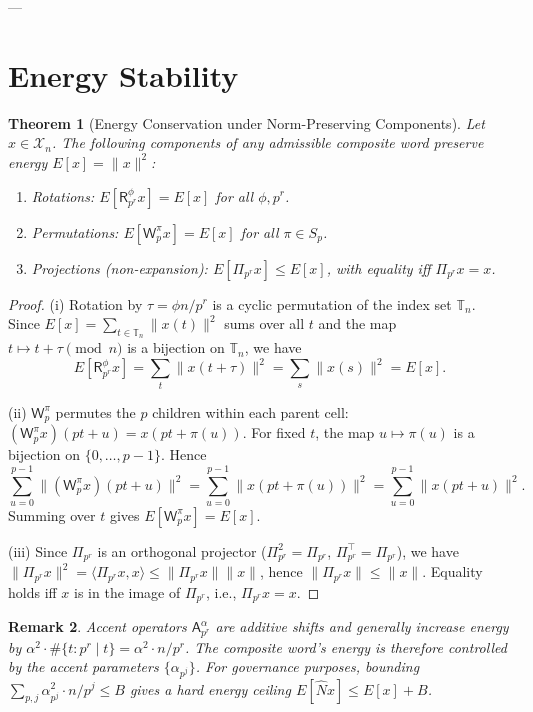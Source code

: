 \documentclass[11pt]{amsart}
\newtheorem{theorem}{Theorem}[section]
\newtheorem{remark}[theorem]{Remark}
\newcommand{\X}{\mathcal{X}}
\newcommand{\Prj}{\Pi}
\newcommand{\Ap}{\mathsf{A}}
\newcommand{\Rp}{\mathsf{R}}
\newcommand{\Wp}{\mathsf{W}}
\newcommand{\bN}{\widehat{N}}
\newcommand{\Tn}{\mathbb{T}_n}
\newcommand{\norm}[1]{\lVert #1 \rVert}
\begin{document}
---

\section{Energy Stability}

\begin{theorem}[Energy Conservation under Norm-Preserving Components]\label{thm:energy}
Let $x \in \X_n$. The following components of any admissible composite word preserve energy $E[x] = \norm{x}^2$:
\begin{enumerate}
  \item[(i)] Rotations: $E[\Rp^\phi_{p^r} x] = E[x]$ for all $\phi, p^r$.
  \item[(ii)] Permutations: $E[\Wp^\pi_p x] = E[x]$ for all $\pi \in S_p$.
  \item[(iii)] Projections (non-expansion): $E[\Prj_{p^r} x] \leq E[x]$, with equality iff $\Prj_{p^r} x = x$.
\end{enumerate}
\end{theorem}

\begin{proof}
(i) Rotation by $\tau = \phi n/p^r$ is a cyclic permutation of the index set $\Tn$. Since $E[x] = \sum_{t \in \Tn}\norm{x(t)}^2$ sums over all $t$ and the map $t \mapsto t + \tau \pmod{n}$ is a bijection on $\Tn$, we have
\[
  E[\Rp^\phi_{p^r} x] = \sum_{t}\norm{x(t+\tau)}^2 = \sum_{s}\norm{x(s)}^2 = E[x].
\]

(ii) $\Wp^\pi_p$ permutes the $p$ children within each parent cell: $(\Wp^\pi_p x)(pt+u) = x(pt + \pi(u))$. For fixed $t$, the map $u \mapsto \pi(u)$ is a bijection on $\{0,\ldots,p-1\}$. Hence
\[
  \sum_{u=0}^{p-1}\norm{(\Wp^\pi_p x)(pt+u)}^2 = \sum_{u=0}^{p-1}\norm{x(pt+\pi(u))}^2 = \sum_{u=0}^{p-1}\norm{x(pt+u)}^2.
\]
Summing over $t$ gives $E[\Wp^\pi_p x] = E[x]$.

(iii) Since $\Prj_{p^r}$ is an orthogonal projector ($\Prj_{p^r}^2 = \Prj_{p^r}$, $\Prj_{p^r}^\top = \Prj_{p^r}$), we have $\norm{\Prj_{p^r} x}^2 = \langle \Prj_{p^r} x, x \rangle \leq \norm{\Prj_{p^r} x}\norm{x}$, hence $\norm{\Prj_{p^r} x} \leq \norm{x}$. Equality holds iff $x$ is in the image of $\Prj_{p^r}$, i.e., $\Prj_{p^r} x = x$.
\end{proof}

\begin{remark}
Accent operators $\Ap^\alpha_{p^r}$ are additive shifts and generally increase energy by $\alpha^2 \cdot \#\{t : p^r \mid t\} = \alpha^2 \cdot n/p^r$. The composite word's energy is therefore controlled by the accent parameters $\{\alpha_{p^j}\}$. For governance purposes, bounding $\sum_{p,j} \alpha_{p^j}^2 \cdot n/p^j \leq B$ gives a hard energy ceiling $E[\bN x] \leq E[x] + B$.
\end{remark}
\end{document}
